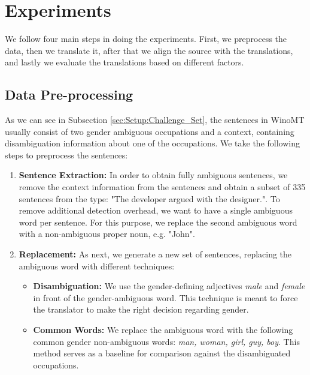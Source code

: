 \chapter{Experiments}
\label{ch:Experiments}


We follow four main steps in doing the experiments. First, we preprocess the data, then we translate it, after that we align the source with the translations, and lastly we evaluate the translations based on different factors.

\section{Data Pre-processing}
\label{sec:Experiments:Pre-processing}

As we can see in Subsection \ref{sec:Setup:Challenge_Set}, the sentences in WinoMT usually consist of two gender ambiguous occupations and a context, containing disambiguation information about one of the occupations. We take the following steps to preprocess the sentences:

\begin{enumerate}
  \item \textbf{Sentence Extraction:}  
  In order to obtain fully ambiguous sentences, we remove the context information from the sentences and obtain a subset of 335 sentences from the type: "The developer argued with the designer.".
  To remove additional detection overhead, we want to have a single ambiguous word per sentence. For this purpose, we replace the second ambiguous word with a non-ambiguous proper noun, e.g. "John". 
  \item \textbf{Replacement:} 
  As next, we generate a new set of sentences, replacing the ambiguous word with different techniques:
  \begin{itemize}
      \item \textbf{Disambiguation:} We use the gender-defining adjectives \textit{male} and \textit{female} in front of the gender-ambiguous word. This technique is meant to force the translator to make the right decision regarding gender. %
      \item \textbf{Common Words:} We replace the ambiguous word with the following common gender non-ambiguous words: \textit{man, woman, girl, guy, boy}. This method serves as a baseline for comparison against the disambiguated occupations.
  \end{itemize}
\end{enumerate}


